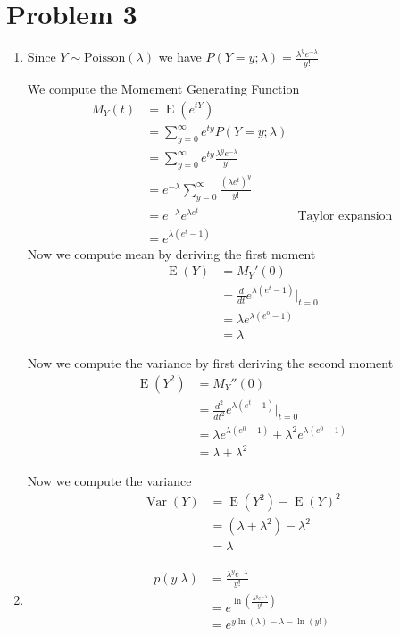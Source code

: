 \documentclass{article}
\DeclareMathOperator{\Var}{Var}
\DeclareMathOperator{\E}{E}
\begin{document}
\section*{Problem 3}
\begin{enumerate}[label=(\alph*)]
\item

Since \(Y \sim \text{Poisson}(\lambda)\) we have
\(P(Y=y;\lambda) = \frac{\lambda^y e^{-\lambda}}{y!}\)

We compute the Momement Generating Function
\begin{align*}
    M_Y(t) &= \E(e^{tY}) \\
    &= \sum_{y=0}^{\infty} e^{ty} P(Y=y;\lambda) \\
    &= \sum_{y=0}^{\infty} e^{ty} \frac{\lambda^y e^{-\lambda}}{y!} \\
    &= e^{-\lambda} \sum_{y=0}^{\infty} \frac{(\lambda e^t)^y}{y!} \\
    &= e^{-\lambda} e^{\lambda e^t} & \text{Taylor expansion}\\
    &= e^{\lambda (e^t - 1)}
\end{align*}
Now we compute mean by deriving the first moment
\begin{align*}
    \E(Y) &= M_Y'(0) \\
    &= \frac{d}{dt} e^{\lambda (e^t - 1)} \bigg|_{t=0} \\
    &= \lambda e^{\lambda (e^0 - 1)} \\
    &= \lambda
\end{align*}

Now we compute the variance by first deriving the second moment
\begin{align*}
    \E(Y^2) &= M_Y''(0) \\
    &= \frac{d^2}{dt^2} e^{\lambda (e^t - 1)} \bigg|_{t=0} \\
    &= \lambda e^{\lambda (e^0 - 1)} + \lambda^2 e^{\lambda (e^0 - 1)} \\
    &= \lambda + \lambda^2
\end{align*}

Now we compute the variance
\begin{align*}
    \Var(Y) &= \E(Y^2) - \E(Y)^2 \\
    &= (\lambda + \lambda^2) - \lambda^2 \\
    &= \lambda
\end{align*}

\item 

\begin{align*}
    p(y | \lambda) &= \frac{\lambda^y e^{-\lambda}}{y!} \\
    &= e^{\ln(\frac{\lambda^y e^{-\lambda}}{y!})} \\
    &= e^{y \ln(\lambda) - \lambda - \ln(y!)} \\
\end{align*}

\end{enumerate}
\end{document}
